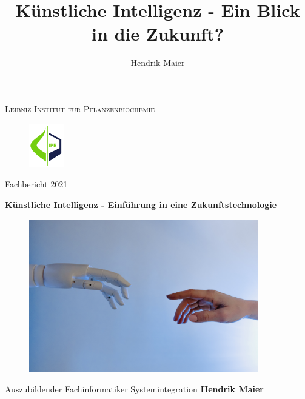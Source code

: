 \documentclass[12pt,german,ngerman]{report}
\title{Künstliche Intelligenz - Ein Blick in die Zukunft?}
\author{Hendrik Maier}
\date{}
\begin{document}
    \begin{titlepage}
        \vspace*{\fill}
            \begin{center}
                 \centering
                 {\scshape\LARGE Leibniz Institut für Pflanzenbiochemie\par}
                 \vspace{1cm}
                 \begin{figure}[h]
                     \includegraphics[width=1.5cm]{ipb_logo.png}
                     \centering
                 \end{figure}
                 {\Large Fachbericht 2021\par}
                 \vspace{1cm}
                 {\huge\bfseries Künstliche Intelligenz - Einführung in eine Zukunftstechnologie\par}
                 \vspace{1cm}
                 \begin{figure}[h]
                     \includegraphics[width=10cm]{michelangelo_ki.jpg}
                     \centering
                 \end{figure}
                 \vspace{1cm}
                 {\Large Auszubildender Fachinformatiker Systemintegration \textbf{Hendrik Maier}\par}
                 \vfill
            \end{center}    
        \vspace*{\fill}
    \end{titlepage}
    
\end{document}
